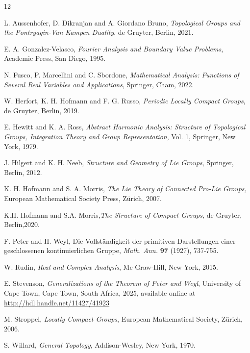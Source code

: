 \documentclass{amsart}
\theoremstyle{definition}
\numberwithin{equation}{section}
\newcommand{\n}{\hfill\\}
\begin{document}





\begin{thebibliography}{12}

L. Aussenhofer, D. Dikranjan and A. Giordano Bruno, \textit{Topological Groups and the Pontryagin-Van Kampen Duality}, de Gruyter, Berlin, 2021.


 E. A. Gonzalez-Velasco, \textit{Fourier Analysis and Boundary Value Problems}, Academic Press, San Diego, 1995.

N. Fusco, P. Marcellini and C. Sbordone, \textit{Mathematical Analysis: Functions of Several Real Variables and Applications}, Springer, Cham, 2022. 



 W. Herfort, K. H. Hofmann and F. G. Russo, \textit{Periodic Locally Compact Groups}, de Gruyter, Berlin, 2019.

E. Hewitt and K. A. Ross, \textit{Abstract Harmonic Analysis: Structure of Topological Groups, Integration Theory and Group Representation}, Vol. 1, Springer, New York, 1979.


J. Hilgert and K. H. Neeb, \textit{Structure and Geometry of Lie Groups}, Springer, Berlin, 2012.


 K. H. Hofmann and S. A. Morris, \textit{The Lie Theory of Connected Pro-Lie Groups,} European Mathematical Society Press, Z\"{u}rich, 2007.

K.H. Hofmann and S.A. Morris,\textit{The Structure of Compact Groups,} de Gruyter, Berlin,2020.


 F. Peter and H. Weyl, Die Vollst\"andigkeit der primitiven Darstellungen einer geschlossenen kontinuierlichen Gruppe, \textit{Math. Ann.} \textbf{97} (1927), 737-755.%

 W. Rudin, \textit{Real and Complex Analysis}, Mc Graw-Hill, New York, 2015.

 E. Stevenson, \textit{Generalizations of the Theorem of Peter and Weyl}, University of Cape Town, Cape Town, South Africa, 2025, available online at \url{http://hdl.handle.net/11427/41923}


 M. Stroppel, \textit{Locally Compact Groups}, European Mathematical Society, Zürich, 2006.




 S. Willard, \textit{General Topology}, Addison-Wesley, New York, 1970.




\end{thebibliography}
\end{document}
